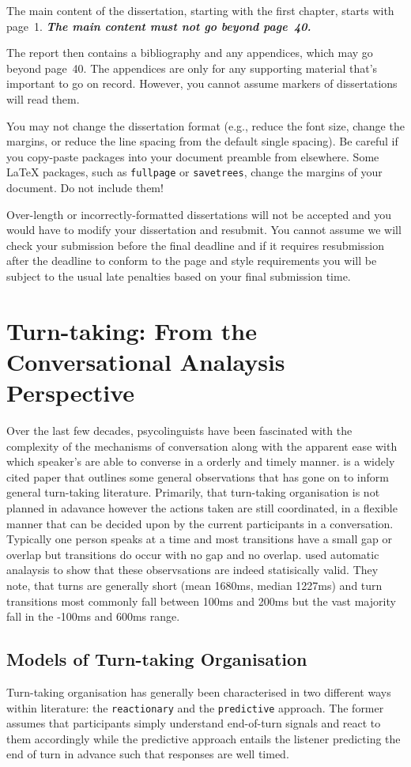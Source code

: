 \documentclass[logo,bsc,singlespacing,parskip]{infthesis}
\begin{document}
The main content of the dissertation, starting with the first chapter,
starts with page~1. \emph{\textbf{The main content must not go beyond page~40.}}

The report then contains a bibliography and any appendices, which may go beyond
page~40. The appendices are only for any supporting material that's important to
go on record. However, you cannot assume markers of dissertations will read them.

You may not change the dissertation format (e.g., reduce the font size, change
the margins, or reduce the line spacing from the default single spacing). Be
careful if you copy-paste packages into your document preamble from elsewhere.
Some \LaTeX{} packages, such as \texttt{fullpage} or \texttt{savetrees}, change
the margins of your document. Do not include them!

Over-length or incorrectly-formatted dissertations will not be accepted and you
would have to modify your dissertation and resubmit. You cannot assume we will
check your submission before the final deadline and if it requires resubmission
after the deadline to conform to the page and style requirements you will be
subject to the usual late penalties based on your final submission time.

\section{Turn-taking: From the Conversational Analaysis Perspective}
Over the last few decades, psycolinguists have been fascinated with the complexity of the mechanisms of conversation along with the apparent ease with which speaker's are able to converse in a orderly and timely manner. 
\cite{Sacks1974} is a widely cited paper that outlines some general observations that has gone on to inform general turn-taking literature. Primarily, that turn-taking organisation is not planned in adavance however the actions taken are still coordinated, in a flexible manner that can be decided upon by the current participants in a conversation. Typically one person speaks at a time and most transitions have a small gap or overlap but transitions do occur with no gap and no overlap. 
\cite{LevTor2015} used automatic analaysis to show that these observsations are indeed statisically valid. They note, that turns are generally short (mean 1680ms, median 1227ms) and turn transitions most commonly fall between 100ms and 200ms but the vast majority fall in the -100ms and 600ms range. 

\subsection{Models of Turn-taking Organisation} 
Turn-taking organisation has generally been characterised in two different ways within literature: the \texttt{reactionary} and the \texttt{predictive} approach.
The former assumes that participants simply understand end-of-turn signals and react to them accordingly while the predictive approach entails the listener predicting the end of turn in advance such that responses are well timed. 
\end{document}
